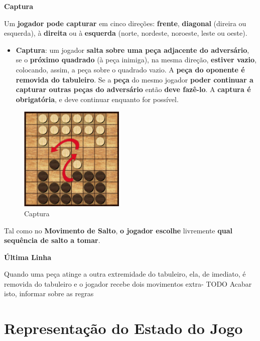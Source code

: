 \documentclass[a4paper]{article}
\begin{document}
\large{\textbf{Captura}}
\begin{small}

Um \textbf{jogador pode capturar} em cinco direções: \textbf{frente}, \textbf{diagonal} (direira ou esquerda), à \textbf{direita} ou à \textbf{esquerda} (norte, nordeste, noroeste, leste ou oeste). 

\begin{itemize}
\item \textbf{Captura}:
um jogador \textbf{salta sobre uma peça adjacente do adversário}, se o \textbf{próximo quadrado} (à peça inimiga), na mesma direção, \textbf{estiver vazio}, colocando, assim, a peça sobre o quadrado vazio. A \textbf{peça do oponente é removida do tabuleiro}. Se a \textbf{peça} do mesmo jogador \textbf{poder continuar a capturar outras peças do adversário} então \textbf{deve fazê-lo}. A \textbf{captura é obrigatória}, e deve continuar enquanto for possível.
\end{itemize}

\begin{figure}[h!]
	\centering
    \includegraphics[height=5cm,width=5cm]{res/captureMove.png}
    \caption{Captura}
    \label{fig:6}
\end{figure}

Tal como no \textbf{Movimento de Salto}, \textbf{o jogador escolhe} livremente \textbf{qual sequência de salto a tomar}.
\end{small}\newline

\large{\textbf{Última Linha}}
\begin{small}

Quando uma peça atinge a outra extremidade do tabuleiro, ela, de imediato, é removida do tabuleiro e o jogador recebe dois movimentos extra- TODO Acabar isto, informar sobre as regras
\end{small}\newline

\section{Representação do Estado do Jogo}
\end{document}
